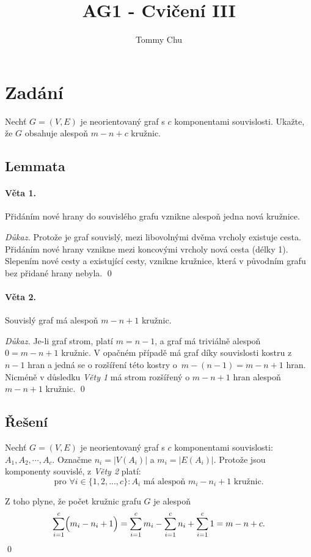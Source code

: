 \documentclass{article}
\title{AG1 - Cvičení III}
\author{Tommy Chu}
\date{}
\begin{document}
\maketitle

\section{Zadání}

Nechť $G = (V, E)$ je neorientovaný graf s $c$ komponentami souvislosti. Ukažte, že $G$ obsahuje alespoň $m - n + c$ kružnic.

\subsection*{Lemmata}

\paragraph*{Věta 1.} Přidáním nové hrany do souvislého grafu vznikne alespoň jedna nová kružnice.

\textit{Důkaz.} Protože je graf souvislý, mezi libovolnými dvěma vrcholy existuje cesta. Přidáním nové hrany vznikne mezi koncovými vrcholy nová cesta (délky 1). Slepením nové cesty a existující cesty, vznikne kružnice, která v původním grafu bez přidané hrany nebyla.
\qed

\paragraph*{Věta 2.} Souvislý graf má alespoň $m - n + 1$ kružnic.

\textit{Důkaz.}
Je-li graf strom, platí $m = n - 1$, a graf má triviálně alespoň $0 = m - n + 1$ kružnic. V opačném případě má graf díky souvislosti kostru z $n-1$ hran a jedná se o rozšíření této kostry o~$m - (n - 1) = m - n + 1$ hran. Nicméně v důsledku \textit{Věty 1} má strom rozšířený o $m - n + 1$ hran alespoň $m - n + 1$ kružnic.
\qed

\subsection*{Řešení}

Nechť $G = (V, E)$ je neorientovaný graf s $c$ komponentami souvislosti: $A_1, A_2, \cdots, A_c$. Označme $n_i = |V(A_i)|$ a $m_i = |E(A_i)|$. Protože jsou komponenty souvislé, z \textit{Věty 2} platí:
\[
    \text{pro $\forall i \in \{1, 2, ..., c\}$} \colon A_i \text{ má alespoň } m_i - n_i + 1 \text{ kružnic}.
\]

Z toho plyne, že počet kružnic grafu $G$ je alespoň
\begin{align*}
    \sum_{i=1}^{c} \Bigl( m_i - n_i + 1 \Bigr) = \sum_{i=1}^{c} m_i - \sum_{i=1}^{c} n_i + \sum_{i=1}^{c} 1 = m - n + c.
\end{align*}
\qed
\end{document}
